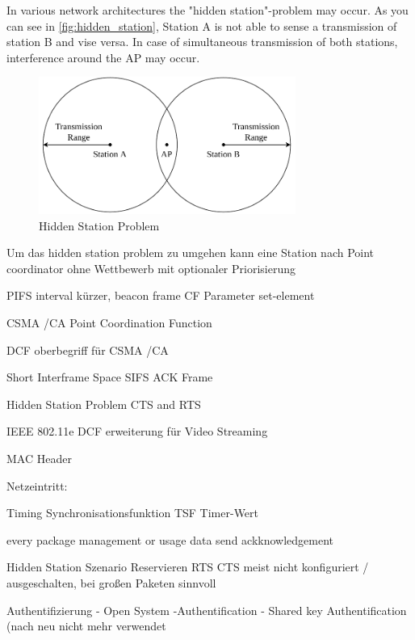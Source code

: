 In various network architectures the "hidden station"-problem may occur. As you can see in \autoref{fig:hidden_station}, Station A is not able to sense a transmission of station B and vise versa. In case of simultaneous transmission of both stations, interference around the \ac{AP} may occur.
\begin{figure}%
	\centering
	\includegraphics[width=0.75\textwidth]{figures/hidden_station.pdf}
	\caption{Hidden Station Problem}%
	\label{fig:hidden_station}%
\end{figure}


Um das hidden station problem zu umgehen kann eine Station nach \textcite{sauter_wireless_2022}
Point coordinator
ohne Wettbewerb mit optionaler Priorisierung

PIFS interval kürzer,
beacon frame
CF Parameter set-element

CSMA /CA
Point Coordination Function

\textcite{sauter_wireless_2022}
DCF oberbegriff für CSMA /CA


Short Interframe Space SIFS ACK Frame

Hidden Station Problem
CTS and RTS

IEEE 802.11e DCF erweiterung für Video Streaming



MAC Header

Netzeintritt:

Timing Synchronisationsfunktion TSF Timer-Wert

\textcite{sauter_wireless_2022}
every package management or usage data send ackknowledgement

Hidden Station Szenario
Reservieren
RTS CTS
meist nicht konfiguriert / ausgeschalten, bei großen Paketen sinnvoll



Authentifizierung
- Open System -Authentification
- Shared key Authentification
(nach neu nicht mehr verwendet